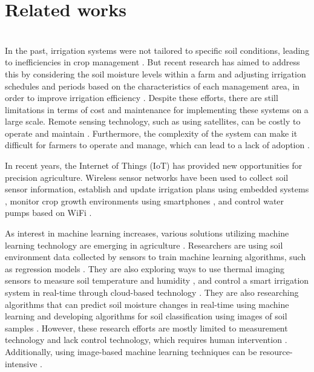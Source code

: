 \documentclass[11pt]{article}
\begin{document}
\section{Related works}
\indent \\In the past, irrigation systems were not tailored to specific soil conditions, leading to inefficiencies in crop management \cite{smith2008history}. But recent research has aimed to address this by considering the soil moisture levels within a farm and adjusting irrigation schedules and periods based on the characteristics of each management area, in order to improve irrigation efficiency \cite{patel2014improving}. Despite these efforts, there are still limitations in terms of cost and maintenance for implementing these systems on a large scale. Remote sensing technology, such as using satellites, can be costly to operate and maintain \cite{khan2016cost}. Furthermore, the complexity of the system can make it difficult for farmers to operate and manage, which can lead to a lack of adoption \cite{johnson2016challenges}.

In recent years, the Internet of Things (IoT) has provided new opportunities for precision agriculture. Wireless sensor networks have been used to collect soil sensor information, establish and update irrigation plans using embedded systems \cite{Patel2017}, monitor crop growth environments using smartphones \cite{Singh2017}, and control water pumps based on WiFi \cite{Ahmed2019}.

As interest in machine learning increases, various solutions utilizing machine learning technology are emerging in agriculture \cite{Almeida2018}. Researchers are using soil environment data collected by sensors to train machine learning algorithms, such as regression models \cite{Almeida2018_A}. They are also exploring ways to use thermal imaging sensors to measure soil temperature and humidity \cite{almeida2018thermal}, and control a smart irrigation system in real-time through cloud-based technology \cite{ahmed2018cloud}. They are also researching algorithms that can predict soil moisture changes in real-time using machine learning \cite{almeida2018real} and developing algorithms for soil classification using images of soil samples \cite{almeida2018soil}. However, these research efforts are mostly limited to measurement technology and lack control technology, which requires human intervention \cite{almeida2018limitations}. Additionally, using image-based machine learning techniques can be resource-intensive \cite{ahmed2018resource}.
\end{document}
